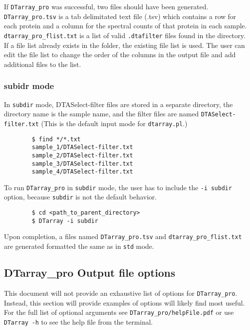 \documentclass[12pt]{article}
\begin{document}
	\noindent
	If \texttt{DTarray\_pro} was successful, two files should have been generated.  \texttt{DTarray\_pro.tsv} is a tab delimitated text file (.tsv) which contains a row for each protein and a column for the spectral counts of that protein in each sample.  \texttt{dtarray\_pro\_flist.txt} is a list of valid \texttt{.dtafilter} files found in the directory.  If a file list already exists in the folder, the existing file list is used.  The user can edit the file list to change the order of the columns in the output file and add additional files to the list.  
	
	\pagebreak
	\subsubsection{subidr mode}
	
	In \texttt{subdir} mode, DTASelect-filter files are stored in a separate directory, the directory name is the sample name, and the filter files are named \texttt{DTASelect-filter.txt} (This is the default input mode for \texttt{dtarray.pl}.)
	
	\begin{lstlisting}
		$ find */*.txt
		sample_1/DTASelect-filter.txt
		sample_2/DTASelect-filter.txt
		sample_3/DTASelect-filter.txt
		sample_4/DTASelect-filter.txt
	\end{lstlisting}
	
	\noindent
	To run \texttt{DTarray\_pro} in \texttt{subdir} mode, the user has to include the \texttt{-i subdir} option, because \texttt{subdir} is not the default behavior.  
	
	\begin{lstlisting}
		$ cd <path_to_parent_directory>
		$ DTarray -i subdir
	\end{lstlisting}
	
	\noindent
	Upon completion, a files named \texttt{DTarray\_pro.tsv} and \texttt{dtarray\_pro\_flist.txt} are generated formatted the same as in \texttt{std} mode.
	
	\subsection{DTarray\_pro Output file options}
	
	This document will not provide an exhaustive list of options for \texttt{DTarray\_pro}. Instead, this section will provide examples of options will likely find most useful.  For the full list of optional arguments see \texttt{DTarray\_pro/helpFile.pdf} or use \texttt{DTarray -h} to see the help file from the terminal.
	
\end{document}
